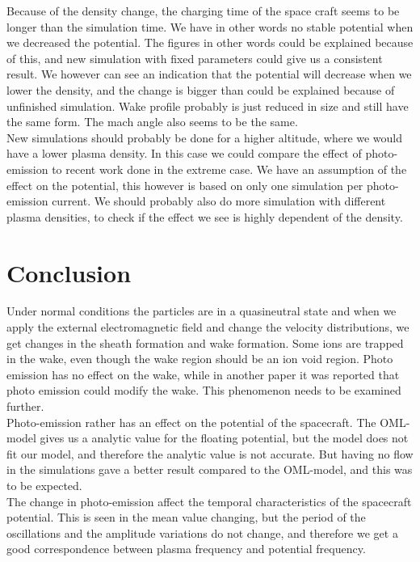 \documentclass[aip, 
rsi, 
amsmath,
amssymb,
longbibliography,
reprint]{revtex4-1}
\begin{document}
Because of the density change, the charging time of the space craft seems to be longer than the simulation time. We have in other words no stable potential when we decreased the potential. The figures in other words could be explained because of this, and new simulation with fixed parameters could give us a consistent result. We however can see an indication that the potential will decrease when we lower the density, and the change is bigger than could be explained because of unfinished simulation. Wake profile probably is just reduced in size and still have the same form. The mach angle also seems to be the same. \\

New simulations should probably be done for a higher altitude, where we would have a lower plasma density. In this case we could compare the effect of photo-emission to recent work done in the extreme case\cite{P8}. We have an assumption of the effect on the potential, this however is based on only one simulation per photo-emission current. We should probably also do more simulation with different plasma densities, to check if the effect we see is highly dependent of the density.

\section{Conclusion}
Under normal conditions the particles are in a quasineutral state and when we apply the external electromagnetic field and change the velocity distributions, we get changes in the sheath formation and wake formation. Some ions are trapped in the wake, even though the wake region should be an ion void region. Photo emission has no effect on the wake, while in another paper it was reported that photo emission could modify the wake\cite{P2}. This phenomenon needs to be examined further. \\

Photo-emission rather has an effect on the potential of the spacecraft. The OML-model gives us a analytic value for the floating potential, but the model does not fit our model, and therefore the analytic value is not accurate. But having no flow in the simulations gave a better result compared to the OML-model, and this was to be expected. \\

The change in photo-emission affect the temporal characteristics of the spacecraft potential. This is seen in the mean value changing, but the period of the oscillations and the amplitude variations do not change, and therefore we get a good correspondence between plasma frequency and potential frequency. \\
\end{document}
